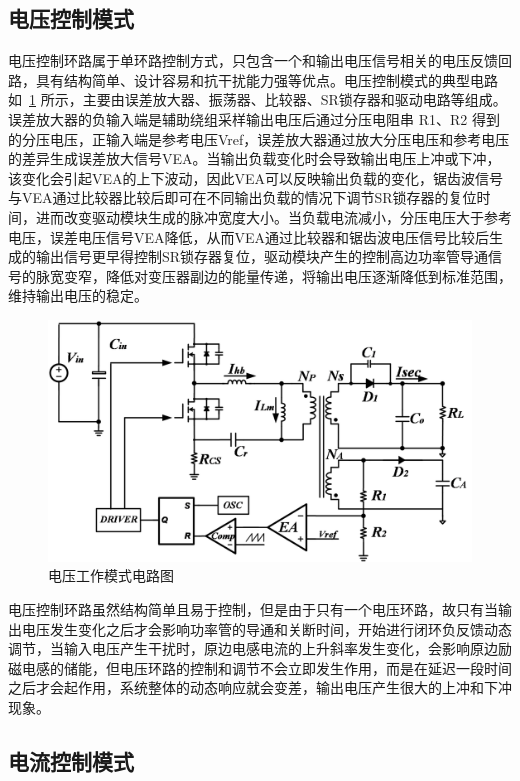 \subsection{电压控制模式}
电压控制环路属于单环路控制方式，只包含一个和输出电压信号相关的电压反馈回路，具有结构简单、设计容易和抗干扰能力强等优点。电压控制模式的典型电路如~\ref{fig:电压工作模式电路图} 所示，主要由误差放大器、振荡器、比较器、SR锁存器和驱动电路等组成。误差放大器的负输入端是辅助绕组采样输出电压后通过分压电阻串 R1、R2 得到的分压电压，正输入端是参考电压Vref，误差放大器通过放大分压电压和参考电压的差异生成误差放大信号VEA。当输出负载变化时会导致输出电压上冲或下冲，该变化会引起VEA的上下波动，因此VEA可以反映输出负载的变化，锯齿波信号与VEA通过比较器比较后即可在不同输出负载的情况下调节SR锁存器的复位时间，进而改变驱动模块生成的脉冲宽度大小。当负载电流减小，分压电压大于参考电压，误差电压信号VEA降低，从而VEA通过比较器和锯齿波电压信号比较后生成的输出信号更早得控制SR锁存器复位，驱动模块产生的控制高边功率管导通信号的脉宽变窄，降低对变压器副边的能量传递，将输出电压逐渐降低到标准范围，维持输出电压的稳定。

\begin{figure}[htbp] 
    \centering
    \includegraphics[width=0.8\linewidth]{figures/电压工作模式电路图.png}
    \caption{电压工作模式电路图}
    \label{fig:电压工作模式电路图}
\end{figure}

电压控制环路虽然结构简单且易于控制，但是由于只有一个电压环路，故只有当输出电压发生变化之后才会影响功率管的导通和关断时间，开始进行闭环负反馈动态调节，当输入电压产生干扰时，原边电感电流的上升斜率发生变化，会影响原边励磁电感的储能，但电压环路的控制和调节不会立即发生作用，而是在延迟一段时间之后才会起作用，系统整体的动态响应就会变差，输出电压产生很大的上冲和下冲现象。

\subsection{电流控制模式}

